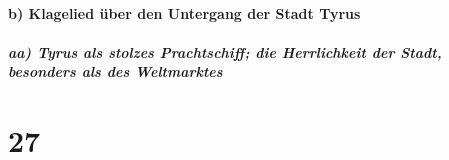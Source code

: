 \hypertarget{b-klagelied-uxfcber-den-untergang-der-stadt-tyrus}{%
\paragraph{b) Klagelied über den Untergang der Stadt
Tyrus}\label{b-klagelied-uxfcber-den-untergang-der-stadt-tyrus}}

\hypertarget{aa-tyrus-als-stolzes-prachtschiff-die-herrlichkeit-der-stadt-besonders-als-des-weltmarktes}{%
\subparagraph{aa) Tyrus als stolzes Prachtschiff; die Herrlichkeit der
Stadt, besonders als des
Weltmarktes}\label{aa-tyrus-als-stolzes-prachtschiff-die-herrlichkeit-der-stadt-besonders-als-des-weltmarktes}}

\hypertarget{section-26}{%
\section{27}\label{section-26}}


